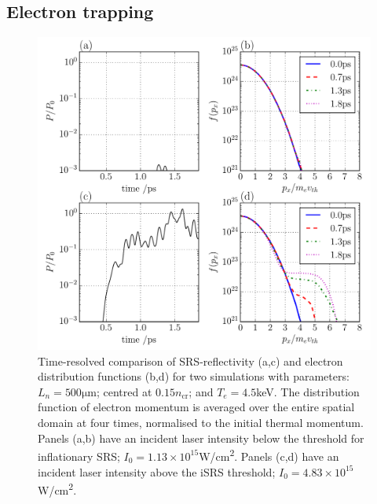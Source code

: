 \subsection{Electron trapping}


\begin{figure}[!ht]
 \centering
 \includegraphics[width=0.8\columnwidth]{Chapters/C4_iSRS/fig3_3a_3b_3c_3d.pdf}
 \caption{Time-resolved comparison of SRS-reflectivity (a,c) and electron distribution 
 functions (b,d) for two simulations with parameters: $L_n = 500 \si{\micro\metre} $; centred
 at $0.15n_\mathrm{cr}$; and $T_e = 4.5$\si{\kilo\electronvolt}. The distribution function of
 electron momentum is averaged over the entire spatial domain at four times, normalised to the initial thermal momentum. Panels (a,b) have an incident laser intensity below the threshold for inflationary SRS; $I_0 = 1.13\times10^{15}$\si{W/\centi\metre^2}. Panels (c,d) have an incident laser intensity above the iSRS threshold; $I_0 = 4.83\times10^{15}$\si{W/\centi\metre^2}.}
 \label{fig:reflAndDist}
\end{figure}

